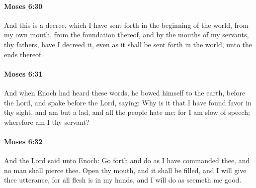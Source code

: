 		\paragraph{Moses 6:30} %
			\label{MOSES-6-30}

			And this is a decree, which I have sent forth in the beginning of the world, from my own mouth, from the foundation thereof, and by the mouths of my servants, thy fathers, have I decreed it, even as it shall be sent forth in the world, unto the ends thereof.


		\paragraph{Moses 6:31} %
			\label{MOSES-6-31}

			And when Enoch had heard these words, he bowed himself to the earth, before the Lord, and spake before the Lord, saying: Why is it that I have found favor in thy sight, and am but a lad, and all the people hate me; for I am slow of speech; wherefore am I thy servant?


		\paragraph{Moses 6:32} %
			\label{MOSES-6-32}

			And the Lord said unto Enoch: Go forth and do as I have commanded thee, and no man shall pierce thee. Open thy mouth, and it shall be filled, and I will give thee utterance, for all flesh is in my hands, and I will do as seemeth me good.

